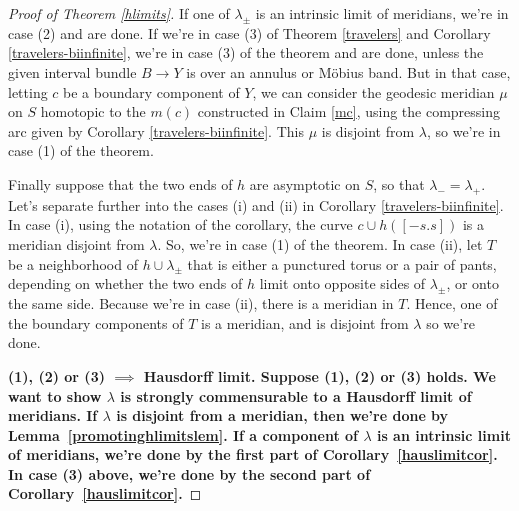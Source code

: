 \documentclass[12pt]{amsart}
\theoremstyle{definition}
\theoremstyle{remark}
\begin{document}
\begin{proof}[Proof of Theorem \ref{hlimits}]
If one of $\lambda_\pm$ is an intrinsic limit of meridians, we're in case (2) and are done. If we're in case (3) of Theorem \ref{travelers} and Corollary \ref{travelers-biinfinite}, we're in case (3) of the theorem and are done, unless the given interval bundle $B\longrightarrow Y$ is over an annulus or M\"obius band. But in that case, letting $c$ be a boundary component of $Y$, we can consider the geodesic meridian $\mu$ on $S$ homotopic to the $m(c)$ constructed in Claim \ref{mc}, using the compressing arc given by Corollary \ref{travelers-biinfinite}. This $\mu$ is disjoint from $\lambda$, so we're in case (1) of the theorem.

Finally suppose that the two ends of $h$ are asymptotic on $S$, so that $\lambda_-=\lambda_+$. Let's separate further into the cases (i) and (ii) in Corollary \ref{travelers-biinfinite}. In case (i), using the notation of the corollary, the curve $c\cup h([-s.s])$ is a meridian disjoint from $\lambda$. So, we're in case (1) of the theorem. In case (ii), let  $T$ be a neighborhood of $h\cup \lambda_\pm$ that is either a punctured torus or a pair of pants, depending on whether the two ends of $h$ limit onto opposite sides of $\lambda_\pm$, or onto the same side. Because we're in case (ii), there is a meridian in $T$. Hence, one of the boundary components of $T$ is a meridian, and is disjoint from $\lambda$ so we're done.

\medskip

\noindent \bf (1), (2) or (3) $\implies$ Hausdorff limit. \rm Suppose (1), (2) or (3) holds. We want to show $\lambda$ is strongly commensurable to a Hausdorff limit of meridians. If $\lambda$ is disjoint from a meridian, then we're done by Lemma~\ref{promotinghlimitslem}. If a component of $\lambda$ is an intrinsic limit of meridians, we're done by the first part of Corollary~\ref{hauslimitcor}. In case (3) above, we're done by the second part of Corollary~\ref{hauslimitcor}.
 \end{proof}

\end{document}
